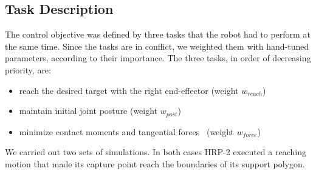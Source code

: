 \subsection{Task Description}
The control objective was defined by three tasks that the robot had to perform at the same time. 
Since the tasks are in conflict, we weighted them with hand-tuned parameters, according to their importance.
The three tasks, in order of decreasing priority, are:
\begin{itemize}
\item reach the desired target with the right end-effector (weight $w_{reach}$)
\item maintain initial joint posture (weight $w_{post}$)
\item minimize contact moments and tangential forces~\cite{Righetti2013} (weight $w_{force}$)
\end{itemize}


We carried out two sets of simulations.
In both cases HRP-2 executed a reaching motion that made its capture point reach the boundaries of its support polygon. 



